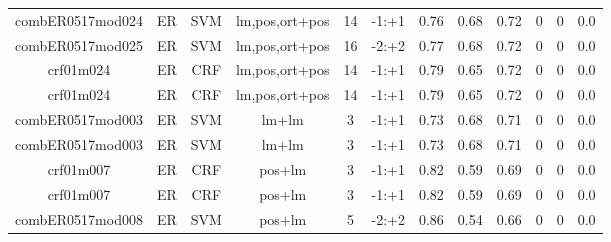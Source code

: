 \documentclass[a4paper]{article}
\begin{document}
\begin{landscape}
\begin{center}
\begin{tabular}{ |c|c|c|c|c|c|c|c|c|c|c|c|}
 		

 	
 
 	
 		
 		\small{ combER0517mod024 } & ER & SVM & lm,pos,ort+pos  &  14 &  -1:+1  &  0.76 & 0.68 & 0.72  &  0 & 0 & 0.0 \\
 		

 	
 
 	
 		
 		\small{ combER0517mod025 } & ER & SVM & lm,pos,ort+pos  &  16 &  -2:+2  &  0.77 & 0.68 & 0.72  &  0 & 0 & 0.0 \\
 		

 	
 
 	
 		
 		\small{ crf01m024 } & ER & CRF & lm,pos,ort+pos  &  14 &  -1:+1  &  0.79 & 0.65 & 0.72  &  0 & 0 & 0.0 \\
 		

 	
 
 	
 		
 		\small{ crf01m024 } & ER & CRF & lm,pos,ort+pos  &  14 &  -1:+1  &  0.79 & 0.65 & 0.72  &  0 & 0 & 0.0 \\
 		

 	
 
 	
 		
 		\small{ combER0517mod003 } & ER & SVM & lm+lm  &  3 &  -1:+1  &  0.73 & 0.68 & 0.71  &  0 & 0 & 0.0 \\
 		

 	
 
 	
 		
 		\small{ combER0517mod003 } & ER & SVM & lm+lm  &  3 &  -1:+1  &  0.73 & 0.68 & 0.71  &  0 & 0 & 0.0 \\
 		

 	
 
 	
 		
 		\small{ crf01m007 } & ER & CRF & pos+lm  &  3 &  -1:+1  &  0.82 & 0.59 & 0.69  &  0 & 0 & 0.0 \\
 		

 	
 
 	
 		
 		\small{ crf01m007 } & ER & CRF & pos+lm  &  3 &  -1:+1  &  0.82 & 0.59 & 0.69  &  0 & 0 & 0.0 \\
 		

 	
 
 	
 		
 		\small{ combER0517mod008 } & ER & SVM & pos+lm  &  5 &  -2:+2  &  0.86 & 0.54 & 0.66  &  0 & 0 & 0.0 \\
 		


\end{tabular}
\end{center}
\end{landscape}
\end{document}
